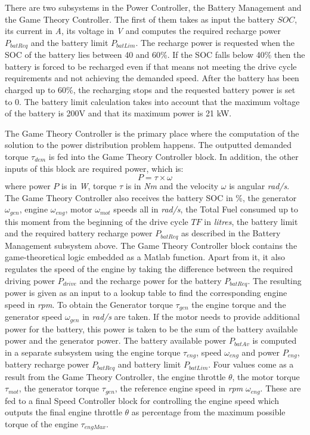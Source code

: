 There are two subsystems in the Power Controller, the Battery Management and the Game Theory Controller. The first of them takes as input the battery $SOC$, its current in \textit{A}, its voltage in \textit{V} and computes the required recharge power $P_{batReq}$ and the battery limit $P_{batLim}$. The recharge power is requested when the SOC of the battery lies between 40 and 60\%. If the SOC falls below 40\% then the battery is forced to be recharged even if that means not meeting the drive cycle requirements and not achieving the demanded speed. After the battery has been charged up to 60\%, the recharging stops and the requested battery power is set to 0. The battery limit calculation takes into account that the maximum voltage of the battery is 200V and that its maximum power is 21 kW.

The Game Theory Controller is the primary place where the computation of the solution to the power distribution problem happens. The outputted demanded torque $\tau_{dem}$ is fed into the Game Theory Controller block. In addition, the other inputs of this block are required power, which is:
\begin{equation}
P = \tau \times \omega
\end{equation}
where power $P$ is in \textit{W}, torque $\tau$ is in \textit{Nm} and the velocity $\omega$ is angular \textit{rad/s}.
The Game Theory Controller also receives the battery SOC in \%, the generator $\omega_{gen}$, engine $\omega_{eng}$, motor $\omega_{mot}$ speeds all in \textit{rad/s}, the Total Fuel consumed up to this moment from the beginning of the drive cycle $TF$ in \textit{litres}, the battery limit and the required battery recharge power $P_{batReq}$ as described in the Battery Management subsystem above. The Game Theory Controller block contains the game-theoretical logic embedded as a Matlab function. Apart from it, it also regulates the speed of the engine by taking the difference between the required driving power $P_{drive}$ and the recharge power for the battery $P_{batReq}$. The resulting power is given as an input to a lookup table to find the corresponding engine speed in \textit{rpm}. To obtain the Generator torque $\tau_{gen}$ the engine torque and the generator speed $\omega_{gen}$ in \textit{rad/s} are taken. If the motor needs to provide additional power for the battery, this power is taken to be the sum of the battery available power and the generator power. The battery available power $P_{batAv}$ is computed in a separate subsystem using the engine torque $\tau_{eng}$, speed $\omega_{eng}$ and power $P_{eng}$, battery recharge power $P_{batReq}$ and battery limit $P_{batLim}$. 
Four values come as a result from the Game Theory Controller, the engine throttle $\theta$, the motor torque $\tau_{mot}$, the generator torque $\tau_{gen}$, the reference engine speed in \textit{rpm} $\omega_{eng}$. These are fed to a final Speed Controller block for controlling the engine speed which outputs the final engine throttle $\theta$ as percentage from the maximum possible torque of the engine $\tau_{engMax}$.

